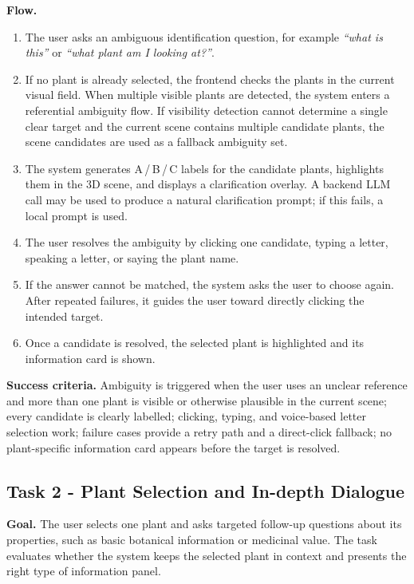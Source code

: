\documentclass[12pt,a4paper]{article}
\newcommand{\tasksub}[1]{\par\smallskip\noindent\textbf{#1}\quad\ignorespaces}
\begin{document}
\tasksub{Flow.}
\begin{enumerate}
    \item The user asks an ambiguous identification question, for example
    \emph{``what is this''} or \emph{``what plant am I looking at?''}.
    \item If no plant is already selected, the frontend checks the plants in
    the current visual field. When multiple visible plants are detected, the
    system enters a referential ambiguity flow. If visibility detection cannot
    determine a single clear target and the current scene contains multiple
    candidate plants, the scene candidates are used as a fallback ambiguity
    set.
    \item The system generates A\,/\,B\,/\,C labels for the candidate plants,
    highlights them in the 3D scene, and displays a clarification overlay.
    A backend LLM call may be used to produce a natural clarification prompt;
    if this fails, a local prompt is used.
    \item The user resolves the ambiguity by clicking one candidate, typing a
    letter, speaking a letter, or saying the plant name.
    \item If the answer cannot be matched, the system asks the user to choose
    again. After repeated failures, it guides the user toward directly
    clicking the intended target.
    \item Once a candidate is resolved, the selected plant is highlighted and
    its information card is shown.
\end{enumerate}

\tasksub{Success criteria.} Ambiguity is triggered when the user uses an
unclear reference and more than one plant is visible or otherwise plausible in
the current scene; every candidate is clearly labelled; clicking, typing, and
voice-based letter selection work; failure cases provide a retry path and a
direct-click fallback; no plant-specific information card appears before the
target is resolved.

\subsection{Task 2 - Plant Selection and In-depth Dialogue}
\tasksub{Goal.} The user selects one plant and asks targeted follow-up
questions about its properties, such as basic botanical information or
medicinal value. The task evaluates whether the system keeps the selected
plant in context and presents the right type of information panel.
\end{document}
